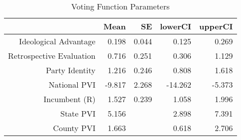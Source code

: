 \begin{table}[h!!!]
\centering
\caption{Voting Function Parameters} 
\label{voteparams}
\begin{tabular}{rrrrr}
  \hline
 & Mean & SE & lowerCI & upperCI \\ 
  \hline
Ideological Advantage & 0.198 & 0.044 & 0.125 & 0.269 \\ 
  Retrospective Evaluation & 0.716 & 0.251 & 0.306 & 1.129 \\ 
  Party Identity & 1.216 & 0.246 & 0.808 & 1.618 \\ 
  National PVI & -9.817 & 2.268 & -14.262 & -5.373 \\ 
  Incumbent (R) & 1.527 & 0.239 & 1.058 & 1.996 \\ 
  State PVI & 5.156 &  & 2.898 & 7.391 \\ 
  County PVI & 1.663 &  & 0.618 & 2.706 \\ 
   \hline
\end{tabular}
\end{table}
